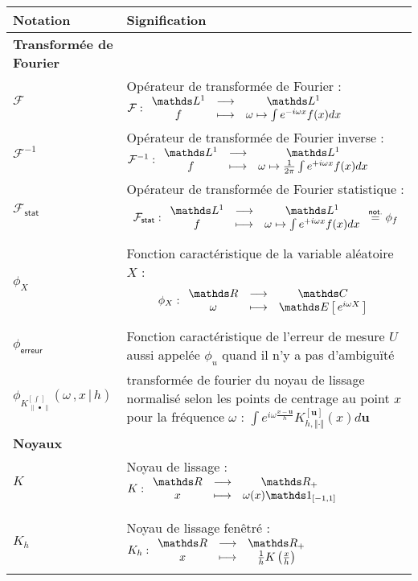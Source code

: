 \begin{tabularx}{\linewidth}{lX}
	\toprule
	\textbf{Notation} & \textbf{Signification}                                                                                                                                                                                   \\
	\midrule
	\textbf{Transformée de Fourier} & \\
	\midrule
	$\mathcal F$ & Opérateur de transformée de Fourier : $\mathcal F : \func{\mathds L^1}{\mathds L^1}{f}{\omega \mapsto \int e^{-i \omega x} f(x) dx}$ \\
	$\mathcal F^{-1}$ & Opérateur de transformée de Fourier inverse : \linebreak $\mathcal F^{-1} : \func{\mathds L^1}{\mathds L^1}{f}{\omega \mapsto \frac 1 {2\pi}\int e^{+i \omega x} f(x) dx}$ \\
	$\mathcal F_{\textsf{stat}}$ & Opérateur de transformée de Fourier \og statistique \fg : \linebreak $$\mathcal F_{\textsf{stat}} : \func{\mathds L^1}{\mathds L^1}{f}{\omega \mapsto \int e^{+i \omega x} f(x) dx} \overset{\textsf{not.}}{=} \phi_f$$ \\
	$\phi_X$ & Fonction caractéristique de la variable aléatoire $X$ : \linebreak $$\phi_X : \func{\grandR}{\mathds C}{\omega}{\esperance{e^{i \omega X}}}$$ \\
	$\phi_{\textsf{erreur}}$ & Fonction caractéristique de l'erreur de mesure $U$ aussi appelée $\phi_u$ quand il n'y a pas d'ambiguïté
	\\
	$\phi_{K_{\, \lVert \, \bullet \, \rVert}^{[\,\int \,]}}(\omega \,, x\, \vert \, h)$ & transformée de fourier du noyau de lissage normalisé selon les points de centrage au point $x$ pour la fréquence $\omega$ : $\int e^{i \omega \frac{x-\mathbf u}h} K_{h, \Vert \cdot \Vert}^{[\mathbf u]}(x) d\mathbf u$
	\\
	\midrule
	\textbf{Noyaux}
	                  &
	\\
	\midrule
	$K$
	                  & Noyau de lissage : $K : \func{\grandR}{\Rplus}{x}{\omega(x)\indicatrice{[-1,1]}}$
	\\\\
	\midrule
	\\
	$K_h$
	                  & Noyau de lissage fenêtré : $K_h : \func{\grandR}{\Rplus}{x}{\frac 1 h K\left( \frac{x}{h} \right)}$
	\\\\

\end{tabularx}
